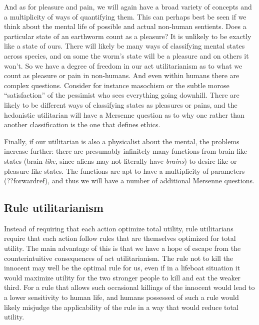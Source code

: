 And as for pleasure and pain, we will again have a broad variety of concepts and a multiplicity of ways of quantifying them.
This can perhaps best be seen if we think about the mental life of possible and actual non-human sentients. Does a particular
state of an earthworm count as a pleasure? It is unlikely to be exactly like a state of ours. There will likely be many ways
of classifying mental states across species, and on some the worm's state will be a pleasure and on others it won't. So we have
a degree of freedom in our act utilitarianism as to what we count as pleasure or pain in non-humans. And even within humans 
there are complex questions. Consider for instance masochism or the subtle morose ``satisfaction'' of the pessimist who sees 
everything going downhill. There are likely to be different ways of classifying states as pleasures or pains, and the hedonistic
utilitarian will have a Mersenne question as to why one rather than another classification is the one that defines ethics.

Finally, if our utilitarian is also a physicalist about the mental, the problems increase further: there are
presumably infinitely many functions from brain-like states (brain-\textit{like}, since aliens may not literally
have \textit{brains}) to desire-like or pleasure-like states. The functions are apt to have a multiplicity of parameters
(??forwardref), and thus we will have a number of additional Mersenne questions. 

\subsection{Rule utilitarianism}
Instead of requiring that each action optimize total utility, rule utilitarians require that each action
follow rules that are themselves optimized for total utility. The main advantage of this is that we have a hope
of escape from the counterintuitive consequences of act utilitarianism. The rule not to kill the innocent may well be the
optimal rule for us, even if in a lifeboat situation it would maximize utility for the two stronger people to kill
and eat the weaker third. For a rule that allows such occasional killings of the innocent would lead to a lower
sensitivity to human life, and humans possessed of such a rule would likely misjudge the applicability of the rule
in a way that would reduce total utility.

